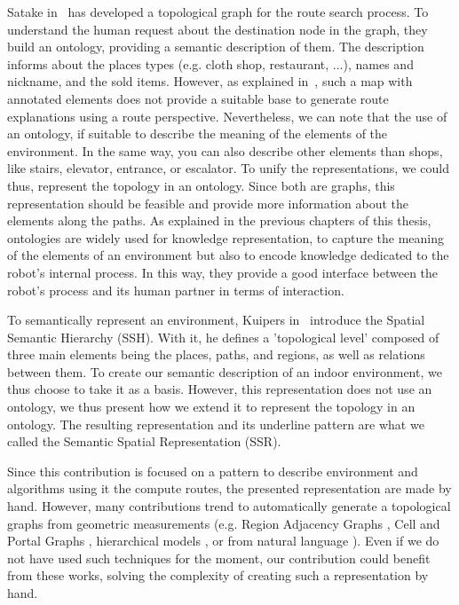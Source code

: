 Satake in~\cite{satake_2015_field} has developed a topological graph for the route search process. To understand the human request about the destination node in the graph, they build an ontology, providing a semantic description of them. The description informs about the places types (e.g. cloth shop, restaurant, ...), names and nickname, and the sold items. However, as explained in~\cite{morales_2015_building}, such a map with annotated elements does not provide a suitable base to generate route explanations using a route perspective. Nevertheless, we can note that the use of an ontology, if suitable to describe the meaning of the elements of the environment. In the same way, you can also describe other elements than shops, like stairs, elevator, entrance, or escalator. To unify the representations, we could thus, represent the topology in an ontology. Since both are graphs, this representation should be feasible and provide more information about the elements along the paths. As explained in the previous chapters of this thesis, ontologies are widely used for knowledge representation, to capture the meaning of the elements of an environment but also to encode knowledge dedicated to the robot's internal process. In this way, they provide a good interface between the robot's process and its human partner in terms of interaction.%

To semantically represent an environment, Kuipers in~\cite{kuipers_2000_spatial} introduce the Spatial Semantic Hierarchy (SSH). With it, he defines a 'topological level' composed of three main elements being the places, paths, and regions, as well as relations between them. To create our semantic description of an indoor environment, we thus choose to take it as a basis. However, this representation does not use an ontology, we thus present how we extend it to represent the topology in an ontology. The resulting representation and its underline pattern are what we called the Semantic Spatial Representation (SSR).

Since this contribution is focused on a pattern to describe environment and algorithms using it the compute routes, the presented representation are made by hand. However, many contributions trend to automatically generate a topological graphs from geometric measurements (e.g. Region Adjacency Graphs \cite{kuipers_2004_local}, Cell and Portal Graphs \cite{lefebvre_2003_automatic}, hierarchical models \cite{lorenz_2006_hybrid}, or from natural language \cite{hemachandra_2014_learning}). Even if we do not have used such techniques for the moment, our contribution could benefit from these works, solving the complexity of creating such a representation by hand.

